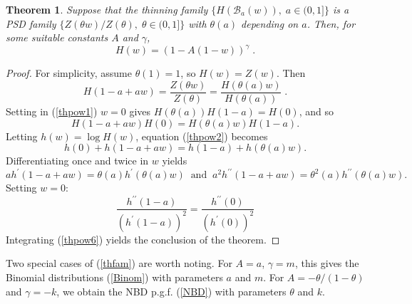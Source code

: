 \documentclass[a4paper,12pt]{amsart}
\newtheorem{Theorem}{Theorem}[section]
\theoremstyle{definition}
\theoremstyle{remark}
\begin{document}
\begin{Theorem}\label{PSD_thin}
Suppose that the thinning family $\{H(\mathcal{B}_a(w)),\; a\in (0,1]\}$ is a PSD family $\{Z(\theta w)/Z(\theta),\; \theta \in (0,1]\}$ with $\theta(a)$ depending on $a$. Then, for some suitable constants $A$ and $\gamma$,
\begin{equation}\label{thfam}
H(w) = (1-A(1-w))^{\gamma} \;.
\end{equation}  
\end{Theorem}
\begin{proof}
For simplicity, assume $\theta(1)=1$, so $H(w)=Z(w)$. Then
\begin{equation}\label{thpow1}
H(1-a+aw)=\frac{Z(\theta w)}{Z(\theta)}= \frac{H(\theta(a)w)}{H(\theta(a))}\;.
\end{equation}
Setting in (\ref{thpow1}) $w=0$ gives
$H(\theta(a))H(1-a)=H(0)$,  and so  
\begin{equation}\label{thpow2}
H(1-a+aw)H(0) = H(\theta(a)w)H(1-a).   
\end{equation}
Letting $h(w)=\log H(w)$, equation (\ref{thpow2})  becomes
\begin{equation}\label{thpow3}
h(0) + h(1-a+aw) = h(1-a) + h(\theta(a)w).  
\end{equation}
Differentiating once and twice  in $w$ yields
\begin{equation}\label{thpow4}
a h^{\prime}(1-a+aw) = \theta(a) h^{\prime}(\theta(a)w)\;\; \text {and}\;\; a^2 h^{\prime \prime}(1-a+aw) = \theta^2(a) h^{\prime \prime}(\theta(a)w).  
\end{equation}
Setting $w=0$:
\begin{equation}\label{thpow6}
\frac{h^{\prime \prime}(1-a)}{(h^{\prime}(1-a))^2}=\frac{h^{\prime \prime}(0)}{(h^{\prime}(0))^2}
\end{equation}
Integrating  (\ref{thpow6}) yields the conclusion of the theorem.
\end{proof}

Two special cases of (\ref{thfam}) are worth noting. For $A=a$, $\gamma=m$, this gives the Binomial distributions (\ref{Binom}) with parameters $a$ and $m$. For $A=-\theta/(1-\theta)$ and $\gamma=-k$, we obtain the NBD p.g.f. (\ref{NBD}) with parameters $\theta$ and $k$. 
\end{document}
